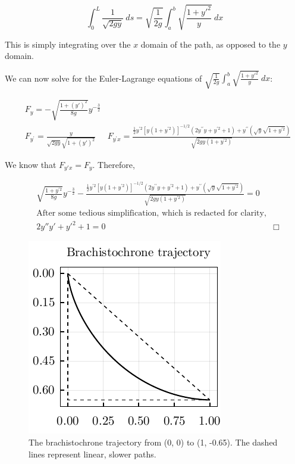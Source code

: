 \documentclass[%
 preprint,
 amsmath,amssymb,
 aps,
 pra,
 fleqn,
]{revtex4-2}
\begin{document}
\[\int_0^L \frac{1}{\sqrt{2gy}} ~ ds = \sqrt{\frac{1}{2g}} \int_a^b \sqrt{\frac{1 + y'^2}{y}} ~ dx\]

This is simply integrating over the $x$ domain of the path, as opposed to the $y$ domain.

We can now solve for the Euler-Lagrange equations of $\displaystyle \sqrt{\frac{1}{2g}} \int_a^b \sqrt{\frac{1 + y'^2}{y}} ~ dx$:

\begin{align*}
    &F_{y}=-\sqrt{\frac{1+(y')^2}{8 g}} y^{-\frac32}\\
    &F_{y^{\prime}}=\frac{y}{\sqrt{2 g y} \sqrt{1+(y')^2}}
    &F_{y^{\prime} x}=\frac{\frac{1}{2} y^{\prime 2}\left[y\left(1+y^{\prime 2}\right)\right]^{-1 / 2}\left(2 y^{\prime \prime} y+y^{\prime 2}+1\right)+y^{\prime \prime}(\sqrt{y} \sqrt{1+y^{\prime 2}})}{\sqrt{2 g y\left(1+y^{\prime 2}\right)}}
\end{align*}

We know that $F_{y'x} = F_y$.  Therefore, %

\begin{align*}
    &\sqrt{\frac{1+y^{\prime 2}}{8 g}} y^{-\frac{3}{2}}-\frac{\frac{1}{2} y^{\prime 2}\left[y\left(1+y^{\prime 2}\right)\right]^{-1 / 2}\left(2 y^{\prime \prime} y+y^{\prime 2}+1\right)+y^{\prime \prime}(\sqrt{y} \sqrt{1+y^{\prime 2}})}{\sqrt{2 g y\left(1+y^{\prime 2}\right)}}=0\\
    &\text{After some tedious simplification, which is redacted for clarity,}\\
    &2y''y' + y'^2 + 1 = 0 & \Box
\end{align*}

\begin{figure}
    \includegraphics{brachistochrone.pdf}
    \caption{The brachistochrone trajectory from (0, 0) to (1, -0.65).  The dashed lines represent linear, slower paths.}
    \label{fig: brachistochrone}
\end{figure}
\end{document}
